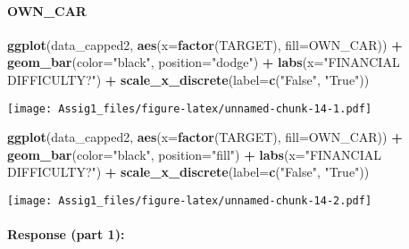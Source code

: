 \documentclass[
]{article}
\newenvironment{Shaded}{\begin{snugshade}}{\end{snugshade}}
\newcommand{\AttributeTok}[1]{\textcolor[rgb]{0.13,0.29,0.53}{#1}}
\newcommand{\FunctionTok}[1]{\textcolor[rgb]{0.13,0.29,0.53}{\textbf{#1}}}
\newcommand{\NormalTok}[1]{#1}
\newcommand{\SpecialCharTok}[1]{\textcolor[rgb]{0.81,0.36,0.00}{\textbf{#1}}}
\newcommand{\StringTok}[1]{\textcolor[rgb]{0.31,0.60,0.02}{#1}}
\begin{document}
\hypertarget{own_car}{%
\paragraph{OWN\_CAR}\label{own_car}}

\begin{Shaded}
\begin{Highlighting}[]
\FunctionTok{ggplot}\NormalTok{(data\_capped2, }\FunctionTok{aes}\NormalTok{(}\AttributeTok{x=}\FunctionTok{factor}\NormalTok{(TARGET), }\AttributeTok{fill=}\NormalTok{OWN\_CAR)) }\SpecialCharTok{+}
  \FunctionTok{geom\_bar}\NormalTok{(}\AttributeTok{color=}\StringTok{"black"}\NormalTok{, }\AttributeTok{position=}\StringTok{"dodge"}\NormalTok{) }\SpecialCharTok{+}
  \FunctionTok{labs}\NormalTok{(}\AttributeTok{x=}\StringTok{"FINANCIAL DIFFICULTY?"}\NormalTok{) }\SpecialCharTok{+}
  \FunctionTok{scale\_x\_discrete}\NormalTok{(}\AttributeTok{label=}\FunctionTok{c}\NormalTok{(}\StringTok{"False"}\NormalTok{, }\StringTok{"True"}\NormalTok{))}
\end{Highlighting}
\end{Shaded}

\texttt{[image: Assig1\_files/figure-latex/unnamed-chunk-14-1.pdf]}

\begin{Shaded}
\begin{Highlighting}[]
\FunctionTok{ggplot}\NormalTok{(data\_capped2, }\FunctionTok{aes}\NormalTok{(}\AttributeTok{x=}\FunctionTok{factor}\NormalTok{(TARGET), }\AttributeTok{fill=}\NormalTok{OWN\_CAR)) }\SpecialCharTok{+}
  \FunctionTok{geom\_bar}\NormalTok{(}\AttributeTok{color=}\StringTok{"black"}\NormalTok{, }\AttributeTok{position=}\StringTok{"fill"}\NormalTok{) }\SpecialCharTok{+}
  \FunctionTok{labs}\NormalTok{(}\AttributeTok{x=}\StringTok{"FINANCIAL DIFFICULTY?"}\NormalTok{) }\SpecialCharTok{+}
  \FunctionTok{scale\_x\_discrete}\NormalTok{(}\AttributeTok{label=}\FunctionTok{c}\NormalTok{(}\StringTok{"False"}\NormalTok{, }\StringTok{"True"}\NormalTok{))}
\end{Highlighting}
\end{Shaded}

\texttt{[image: Assig1\_files/figure-latex/unnamed-chunk-14-2.pdf]}

\hypertarget{response-part-1-2}{%
\paragraph{Response (part 1):}\label{response-part-1-2}}
\end{document}
